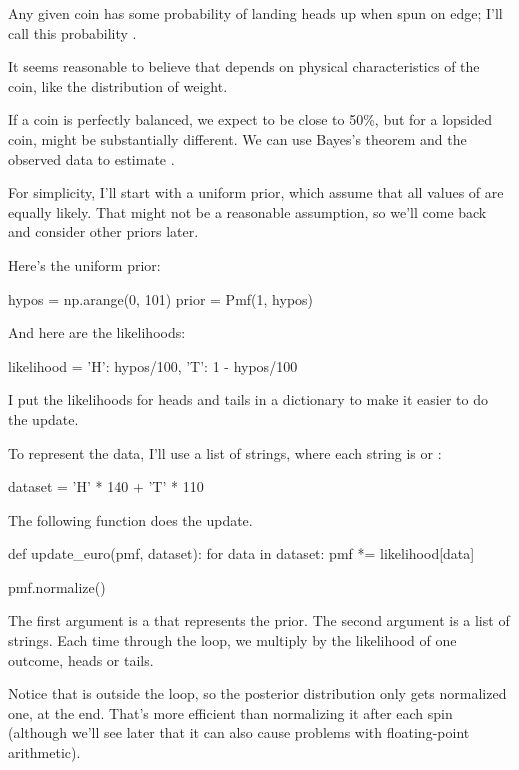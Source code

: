 \documentclass[12pt]{book}
\theoremstyle{exercise}
\begin{document}
Any given coin has some probability of landing heads up when spun
on edge; I'll call this probability .

It seems reasonable to believe that  depends
on physical characteristics of the coin, like the distribution
of weight.

If a coin is perfectly balanced, we expect  to be close to 50\%, but
for a lopsided coin,  might be substantially different.  We can use
Bayes's theorem and the observed data to estimate .

For simplicity, I'll start with a uniform prior, which assume that all values of  are equally likely.
That might not be a reasonable assumption, so we'll come back and consider other priors later.

Here's the uniform prior:

\begin{code}
hypos = np.arange(0, 101)
prior = Pmf(1, hypos)
\end{code}

And here are the likelihoods:

\begin{code}
likelihood = {
    'H': hypos/100,
    'T': 1 - hypos/100
}
\end{code}

I put the likelihoods for heads and tails in a dictionary to make it easier to do the update.

To represent the data, I'll use a list of strings, where each string is  or :

\begin{code}
dataset = 'H' * 140 + 'T' * 110
\end{code}

The following function does the update.

\begin{code}
def update_euro(pmf, dataset):
    for data in dataset:
        pmf *= likelihood[data]

    pmf.normalize()
\end{code}

The first argument is a  that represents the prior.
The second argument is a list of strings.
Each time through the loop, we multiply  by the likelihood of one outcome, heads or tails.

Notice that  is outside the loop, so the posterior distribution only gets normalized one, at the end.
That's more efficient than normalizing it after each spin (although we'll see later that it can also cause problems with floating-point arithmetic).
\end{document}
